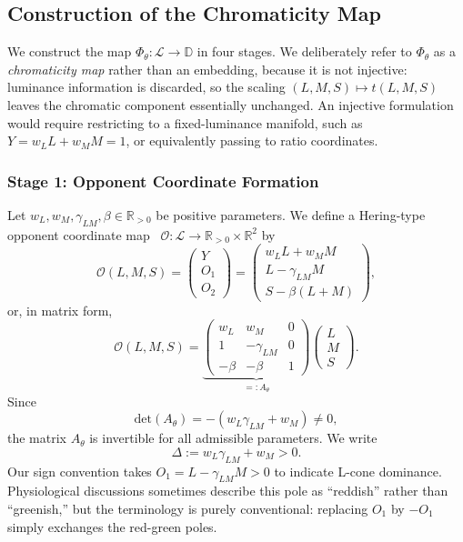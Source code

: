\documentclass[11pt]{article}
\theoremstyle{plain}
\theoremstyle{definition}
\theoremstyle{remark}
\newcommand{\R}{\mathbb{R}}
\newcommand{\Rpp}{\mathbb{R}_{> 0}}     %
\newcommand{\D}{\mathbb{D}}
\newcommand{\Det}{\mathrm{det}}
\begin{document}
\subsection{Construction of the Chromaticity Map}
\label{sec:construction}

We construct the map $\Phi_\theta: \mathcal{L} \to \D$ in four stages. We deliberately refer to $\Phi_\theta$ as a \emph{chromaticity map} rather than an embedding, because it is not injective: luminance information is discarded, so the scaling $(L, M, S) \mapsto t(L, M, S)$ leaves the chromatic component essentially unchanged. An injective formulation would require restricting to a fixed-luminance manifold, such as $Y = w_L L + w_M M = 1$, or equivalently passing to ratio coordinates.

\subsubsection{Stage 1: Opponent Coordinate Formation}

Let $w_L, w_M, \gamma_{LM}, \beta \in \Rpp$ be positive parameters. We define a Hering-type opponent coordinate map~\cite{Hering1878} $\mathcal{O}: \mathcal{L} \to \Rpp \times \R^2$ by
\begin{equation}
\mathcal{O}(L, M, S) = \begin{pmatrix} Y \\ O_1 \\ O_2 \end{pmatrix} = \begin{pmatrix} w_L L + w_M M \\ L - \gamma_{LM} M \\ S - \beta(L + M) \end{pmatrix},
\end{equation}
or, in matrix form,
\begin{equation}
\boxed{
\mathcal{O}(L, M, S) = \underbrace{\begin{pmatrix} w_L & w_M & 0 \\ 1 & -\gamma_{LM} & 0 \\ -\beta & -\beta & 1 \end{pmatrix}}_{=: A_\theta} \begin{pmatrix} L \\ M \\ S \end{pmatrix}.
}
\end{equation}
Since
\begin{equation}
\Det(A_\theta) = -(w_L \gamma_{LM} + w_M) \neq 0,
\end{equation}
the matrix $A_\theta$ is invertible for all admissible parameters. We write
\begin{equation}
\Delta := w_L \gamma_{LM} + w_M > 0.
\end{equation}
Our sign convention takes $O_1 = L - \gamma_{LM} M > 0$ to indicate L-cone dominance. Physiological discussions sometimes describe this pole as ``reddish'' rather than ``greenish,'' but the terminology is purely conventional: replacing $O_1$ by $-O_1$ simply exchanges the red-green poles.
\end{document}
